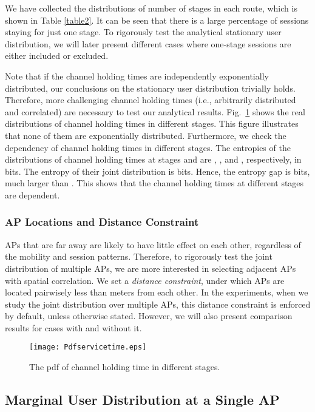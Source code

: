 We have collected the distributions of number of stages in each route, which is shown in Table \ref{table2}.  It can be seen that there is a large percentage of sessions staying for just one stage.  To rigorously test the analytical stationary user distribution, we will later present different cases where one-stage sessions are either included or excluded.

Note that if the channel holding times are independently exponentially distributed, our conclusions on the stationary user distribution trivially holds. Therefore, more challenging channel holding times (i.e., arbitrarily distributed and correlated) are necessary to test our analytical results. Fig.~\ref{servicetime} shows the real distributions of channel holding times in different stages. This figure illustrates that none of them are exponentially distributed.  Furthermore, we check the dependency of channel holding times in different stages. The entropies of the distributions of channel holding times at stages  and  are , ,  and , respectively, in bits. The entropy of their joint distribution is  bits. Hence, the entropy gap is  bits, much larger than .  This shows that the channel holding times at different stages are dependent.


\subsubsection{AP Locations and Distance Constraint}
APs that are far away are likely to have little effect on each other, regardless of the mobility and session patterns.  Therefore, to rigorously test the joint distribution of multiple APs, we are more interested in selecting adjacent APs with spatial correlation.  We set a \emph{distance constraint}, under which APs are located pairwisely less than  meters from each other. In the experiments, when we study the joint distribution over multiple APs, this distance constraint is enforced by default, unless otherwise stated. However, we will also present comparison results for
cases with and without it.


\begin{figure}[tbp]
\centering  \hspace{0pt}
\texttt{[image: Pdfservicetime.eps]}
\caption{The pdf of channel holding time in different stages.}
\label{servicetime}
\end{figure}





\subsection{Marginal User Distribution at a Single AP}

